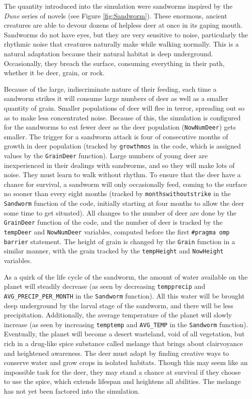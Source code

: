 \documentclass{article}
\begin{document}
The quantity introduced into the simulation were sandworms inspired by the \textit{Dune} series of novels (see Figure \ref{fig:Sandworm}).  These enormous, ancient creatures are able to devour dozens of helpless deer at once in its gaping mouth.  Sandworms do not have eyes, but they are very sensitive to noise, particularly the rhythmic noise that creatures naturally make while walking normally.  This is a natural adaptation because their natural habitat is deep underground.  Occasionally, they breach the surface, consuming everything in their path, whether it be deer, grain, or rock.

Because of the large, indiscriminate nature of their feeding, each time a sandworm strikes it will consume large numbers of deer as well as a smaller quantity of grain.  Smaller populations of deer will flee in terror, spreading out so as to make less concentrated noise.  Because of this, the simulation is configured for the sandworms to eat fewer deer as the deer population (\texttt{NowNumDeer}) gets smaller.  The trigger for a sandworm attack is four of consecutive months of growth in deer population (tracked by \texttt{growthmos} in the code, which is assigned values by the \texttt{GrainDeer} function).  Large numbers of young deer are inexperienced in their dealings with sandworms, and so they will make lots of noise.  They must learn to walk without rhythm.  To ensure that the deer have a chance for survival, a sandworm will only occasionally feed, coming to the surface no sooner than every eight months (tracked by \texttt{monthswithoutstrike} in the \texttt{Sandworm} function of the code, initially starting at four months to allow the deer some time to get situated).  All changes to the number of deer are done by the \texttt{GrainDeer} function of the code, and the number of deer is tracked by the \texttt{tempDeer} and \texttt{NowNumDeer} variables, computed before the first \texttt{\#pragma omp barrier} statement.  The height of grain is changed by the \texttt{Grain} function in a similar manner, with the grain tracked by the \texttt{tempHeight} and \texttt{NowHeight} variables.

As a quirk of the life cycle of the sandworm, the amount of water available on the planet will steadily decrease (as seen by decreasing \texttt{tempprecip} and \texttt{AVG\_PRECIP\_PER\_MONTH} in the \texttt{Sandworm} function).  All this water will be brought deep underground by the larval stage of the sandworm, and there will be less precipitation.  Additionally, the average temperature of the planet will slowly increase (as seen by increasing \texttt{temptemp} and \texttt{AVG\_TEMP} in the \texttt{Sandworm} function).  Eventually, the planet will become a desert wasteland, void of all vegetation, but rich in a drug-like spice substance called melange that brings about clairvoyance and heightened awareness.  The deer must adapt by finding creative ways to conserve water and grow crops in isolated habitats. Though this may seem like an impossible task for the deer, they may stand a chance at survival if they choose to use the spice, which extends lifespan and heightens all abilities.  The melange has not yet been factored into the simulation.
\end{document}
